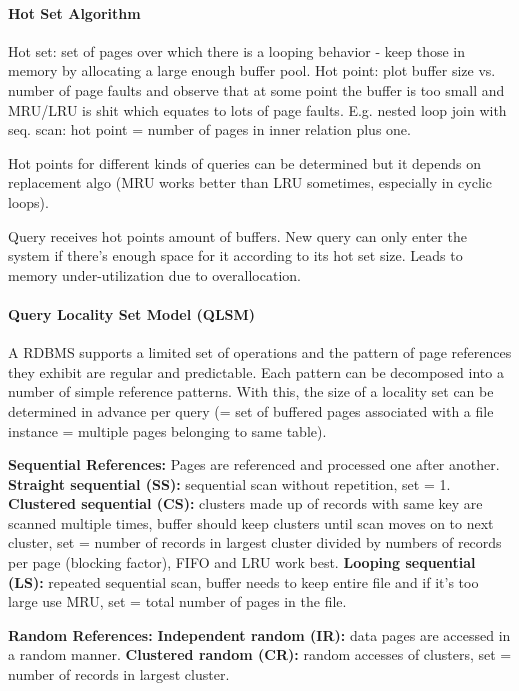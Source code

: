\paragraph{Hot Set Algorithm}
Hot set: set of pages over which there is a looping behavior - keep those in memory by allocating a large enough buffer pool. Hot point: plot buffer size vs. number of page faults and observe that at some point the buffer is too small and MRU/LRU is shit which equates to lots of page faults. E.g. nested loop join with seq. scan: hot point = number of pages in inner relation plus one.

Hot points for different kinds of queries can be determined but it depends on replacement algo (MRU works better than LRU sometimes, especially in cyclic loops).

Query receives hot points amount of buffers. New query can only enter the system if there's enough space for it according to its hot set size. Leads to memory under-utilization due to overallocation.

\paragraph{Query Locality Set Model (QLSM)}
A RDBMS supports a limited set of operations and the pattern of page references they exhibit are regular and predictable. Each pattern can be decomposed into a number of simple reference patterns. With this, the size of a locality set can be determined in advance per query (= set of buffered pages associated with a file instance = multiple pages belonging to same table). %

\textbf{Sequential References:} Pages are referenced and processed one after another. \textbf{Straight sequential (SS):} sequential scan without repetition, set = 1. \textbf{Clustered sequential (CS):} clusters made up of records with same key are scanned multiple times, buffer should keep clusters until scan moves on to next cluster, set = number of records in largest cluster divided by numbers of records per page (blocking factor), FIFO and LRU work best. \textbf{Looping sequential (LS):} repeated sequential scan, buffer needs to keep entire file and if it's too large use MRU, set = total number of pages in the file.

\textbf{Random References:} \textbf{Independent random (IR):} data pages are accessed in a random manner. \textbf{Clustered random (CR):} random accesses of clusters, set = number of records in largest cluster. %

